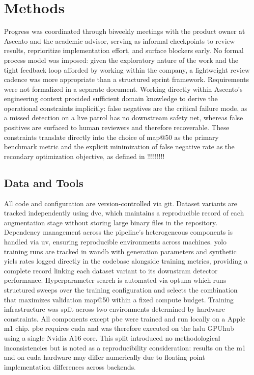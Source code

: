 \chapter{Methods}

Progress was coordinated through biweekly meetings with the product owner at Ascento and the academic advisor, serving 
as informal checkpoints to review results, reprioritize implementation effort, 
and surface blockers early. No formal process model was imposed: given the exploratory nature of the work and the 
tight feedback loop afforded by working within the company, 
a lightweight review cadence was more appropriate than a structured sprint framework. 
Requirements were not formalized in a separate document. Working directly within Ascento's 
engineering context procided sufficient domain knowledge to derive the operational constraints implicitly: 
false negatives are the critical failure mode, as a missed detection on a live patrol has no downstream safety net, 
whereas false positives are surfaced to human reviewers and therefore recoverable. These constraints translate directly 
into the choice of \gls{map@50} as the primary benchmark metric and the explicit minimization of false negative rate as 
the recondary optimization objective, as defined in !!!!!!!!!
\section{Data and Tools}
All code and configuration are version-controlled via \gls{git}. 
Dataset variants are tracked independently using \gls{dvc}, 
which maintains a reproducible record of each augmentation stage 
without storing large binary files in the repository. 
Dependency management across the pipeline's heterogeneous components is 
handled via \gls{uv}, ensuring reproducible environments across machines. 
\gls{yolo} training runs are tracked in \gls{wandb} with generation 
parameters and synthetic yiels rates logged directly in the codebase 
alongside training metrics, providing a complete record linking 
each dataset variant to its downstram detector performance.  
Hyperparameter search is automated via \gls{optuna} which runs structured 
sweeps over the training configuration and selects the combination 
that maximizes validation \gls{map@50} within a fixed compute budget. 
Training infrastructure was split across two environments determined 
by hardware constraints. All components except \gls{pbe} were trained 
and run locally on a Apple \gls{m1} chip.
\gls{pbe} requires \gls{cuda} and was therefore executed on the 
\gls{hslu} GPUhub using a single Nvidia A16 core. This split introduced no methodological 
inconsistencies but is noted as a reproducibility consideration: results on the \gls{m1} and 
on \gls{cuda} hardware may differ numerically due to floating point implementation 
differences across backends. 
